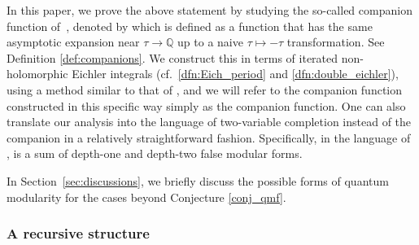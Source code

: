 \documentclass[pdftex]{sigma}
\def\Zh{\widehat{Z}}
\newcommand{\QQ}{\mathbb{Q}}
\theoremstyle{definition}
\numberwithin{equation}{section}
\begin{document}
In this paper, we prove the above statement by studying the so-called companion function of~\smash{$\Zh^G_{\vec{\underline{b}}}$}, denoted by  which is defined as a function that has the same asymptotic expansion near $\tau\to \QQ$ up to a naive $\tau\mapsto -\tau$ transformation. See Definition \ref{def:companions}. We construct this in terms of iterated non-holomorphic Eichler integrals (cf.\ \eqref{dfn:Eich_period} and \eqref{dfn:double_eichler}), using a method similar to that of \cite{bringmann2018higher}, and we will refer to the companion function constructed in this specific way simply as the companion function. One can also translate our analysis into the language of two-variable completion \cite{Bringmann:2021dxg} instead of the companion in a relatively straightforward fashion. Specifically, in the language of \cite{Bringmann:2021dxg}, \smash{$\Zh^G_{\vec{\underline{b}}}$} is a sum of depth-one and depth-two false modular forms.

In Section~\ref{sec:discussions}, we briefly discuss the possible forms of quantum modularity for the cases beyond Conjecture \ref{conj_qmf}.

\subsubsection*{A recursive structure}
\end{document}
